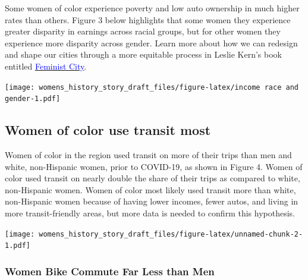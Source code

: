 \documentclass[
  12pt,
]{article}
\begin{document}
Some women of color experience poverty and low auto ownership in much
higher rates than others. Figure 3 below highlights that some women they
experience greater disparity in earnings across racial groups, but for
other women they experience more disparity across gender. Learn more
about how we can redesign and shape our cities through a more equitable
process in Leslie Kern's book entitled
\href{https://metropolismag.com/viewpoints/leslie-kern-feminist-city/}{\underline{\textcolor{blue}{Feminist City}}}.

\texttt{[image: womens\_history\_story\_draft\_files/figure-latex/income race and gender-1.pdf]}

\hypertarget{women-of-color-use-transit-most}{%
\subsection{Women of color use transit
most}\label{women-of-color-use-transit-most}}

Women of color in the region used transit on more of their trips than
men and white, non-Hispanic women, prior to COVID-19, as shown in Figure
4. Women of color used transit on nearly double the share of their trips
as compared to white, non-Hispanic women. Women of color most likely
used transit more than white, non-Hispanic women because of having lower
incomes, fewer autos, and living in more transit-friendly areas, but
more data is needed to confirm this hypothesis.

\texttt{[image: womens\_history\_story\_draft\_files/figure-latex/unnamed-chunk-2-1.pdf]}

\hypertarget{women-bike-commute-far-less-than-men}{%
\subsubsection{Women Bike Commute Far Less than
Men}\label{women-bike-commute-far-less-than-men}}
\end{document}
